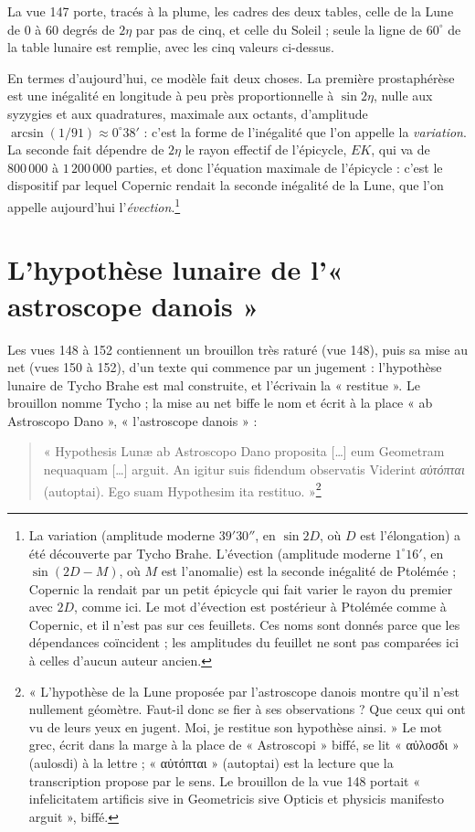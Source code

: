 \documentclass[11pt,a4paper]{article}
\begin{document}
La vue 147 porte, tracés à la plume, les cadres des deux tables, celle de la
Lune de $0$ à $60$ degrés de $2\eta$ par pas de cinq, et celle du Soleil ; seule la
ligne de $60^\circ$ de la table lunaire est remplie, avec les cinq valeurs
ci-dessus.

En termes d'aujourd'hui, ce modèle fait deux choses. La première prostaphérèse
est une inégalité en longitude à peu près proportionnelle à $\sin 2\eta$, nulle
aux syzygies et aux quadratures, maximale aux octants, d'amplitude
$\arcsin(1/91) \approx 0^\circ 38'$ : c'est la forme de l'inégalité que l'on
appelle la \emph{variation}. La seconde fait dépendre de $2\eta$ le rayon effectif
de l'épicycle, $EK$, qui va de $800\,000$ à $1\,200\,000$ parties, et donc
l'équation maximale de l'épicycle : c'est le dispositif par lequel Copernic
rendait la seconde inégalité de la Lune, que l'on appelle aujourd'hui
l'\emph{évection}.\footnote{La variation (amplitude moderne $39'30''$, en
$\sin 2D$, où $D$ est l'élongation) a été découverte par Tycho Brahe. L'évection
(amplitude moderne $1^\circ 16'$, en $\sin(2D - M)$, où $M$ est l'anomalie) est la
seconde inégalité de Ptolémée ; Copernic la rendait par un petit épicycle qui
fait varier le rayon du premier avec $2D$, comme ici. Le mot d'évection est
postérieur à Ptolémée comme à Copernic, et il n'est pas sur ces feuillets. Ces
noms sont donnés parce que les dépendances coïncident ; les amplitudes du
feuillet ne sont pas comparées ici à celles d'aucun auteur ancien.}

\section*{L'hypothèse lunaire de l'« astroscope danois »}

Les vues 148 à 152 contiennent un brouillon très raturé (vue 148), puis sa mise au
net (vues 150 à 152), d'un texte qui commence par un jugement : l'hypothèse
lunaire de Tycho Brahe est mal construite, et l'écrivain la « restitue ». Le
brouillon nomme Tycho ; la mise au net biffe le nom et écrit à la place « ab
Astroscopo Dano », « l'astroscope danois » :

\begin{quote}
« Hypothesis Lunæ ab Astroscopo Dano proposita [\ldots] eum Geometram nequaquam
[\ldots] arguit. An igitur suis fidendum observatis Viderint \emph{αὐτόπται} (autoptai). Ego
suam Hypothesim ita restituo. »\footnote{« L'hypothèse de la Lune proposée par
l'astroscope danois montre qu'il n'est nullement géomètre. Faut-il donc se fier à
ses observations ? Que ceux qui ont vu de leurs yeux en jugent. Moi, je restitue
son hypothèse ainsi. » Le mot grec, écrit dans la marge à la place de
« Astroscopi » biffé, se lit « αὐλοσδι » (aulosdi) à la lettre ; « αὐτόπται » (autoptai) est la lecture
que la transcription propose par le sens. Le brouillon de la vue 148 portait
« infelicitatem artificis sive in Geometricis sive Opticis et physicis manifesto
arguit », biffé.}
\end{quote}
\end{document}
